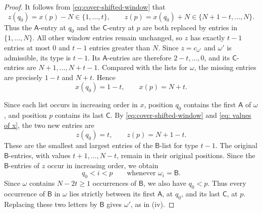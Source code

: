 \documentclass[11pt,a4paper,reqno]{amsart}
\numberwithin{equation}{section}
\theoremstyle{definition}
\theoremstyle{remark}
\theoremstyle{plain}
\newcommand{\A}{\mathsf A}
\newcommand{\B}{\mathsf B}
\newcommand{\CC}{\mathsf C}
\begin{document}
\begin{proof}
It follows from \eqref{eq:cover-shifted-window} that
\[
 z(q_0)=x(p)-N\in\{1,\ldots,t\},\qquad
 z(p)=x(q_0)+N\in\{N+1-t,\ldots,N\}.
\]
Thus the $\A$-entry at $q_0$ and the $\CC$-entry at $p$ are both
replaced by entries in $\{1,\ldots,N\}$.
All other window entries remain unchanged, so $z$ has exactly
$t-1$ entries at most $0$ and $t-1$ entries greater than $N$.
Since $z=c_{\omega'}$ and $\omega'$ is admissible, its type is $t-1$.
Its $\A$-entries are therefore $2-t,\ldots,0$, and its
$\CC$-entries are $N+1,\ldots,N+t-1$.
Compared with the lists for $\omega$, the missing entries are
precisely $1-t$ and $N+t$. Hence
\begin{equation}\label{eq: values of x}
   x(q_0)=1-t,\qquad x(p)=N+t.  
\end{equation}

Since each list occurs in increasing order in $x$, position $q_0$
contains the first $\A$ of $\omega$, and position $p$ contains its
last $\CC$. By \eqref{eq:cover-shifted-window} and
\eqref{eq: values of x}, the two new entries are
\[
 z(q_0)=t,\qquad z(p)=N+1-t.
\]
These are the smallest and largest entries of the $\B$-list for
type $t-1$. The original $\B$-entries, with values
$t+1,\ldots,N-t$, remain in their original positions.
Since the $\B$-entries of $z$ occur in increasing order, we obtain
\[
 q_0<i<p\qquad\text{whenever }\omega_i=\B.
\]
Since $\omega$ contains $N-2t\geq1$ occurrences of $\B$, we also
have $q_0<p$. Thus every occurrence of $\B$ in $\omega$ lies strictly
between its first $\A$, at $q_0$, and its last $\CC$, at $p$.
Replacing these two letters by $\B$ gives $\omega'$, as in
\textup{(iv)}.
\end{proof}
\end{document}
